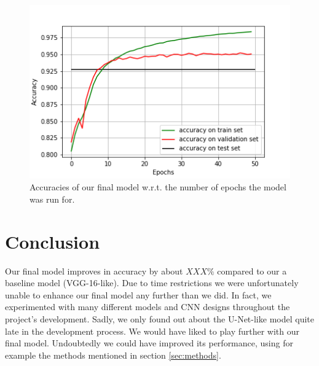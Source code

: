 \documentclass[10pt,conference,compsocconf]{IEEEtran}
\begin{document}
\begin{figure}[h]
	\centering
	\includegraphics[width=\columnwidth]{U_Net_patches_256.png}
	\captionsetup{justification=centering, margin=0.2cm}
	\caption{Accuracies of our final model w.r.t. the number of epochs the model was run for.}
	\vspace{-6mm}
	\label{fig:final}
\end{figure}

\bigskip
\bigskip

\section{Conclusion}
\label{sec:conclusion}

Our final model improves in accuracy by about $XXX\%$ compared to our a baseline model (VGG-16-like). Due to time restrictions we were unfortunately unable to enhance our final model any further than we did. In fact, we experimented with many different models and CNN designs throughout the project's development. Sadly, we only found out about the U-Net-like model quite late in the development process. We would have liked to play further with our final model. Undoubtedly we could have improved its performance, using for example the methods mentioned in section \ref{sec:methods}. 
\end{document}

